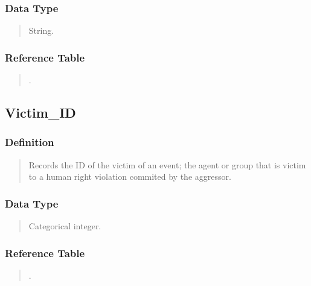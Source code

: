 \documentclass[letterpaper,10pt,english]{sphinxmanual}
\begin{document}
\subsubsection{Data Type}
\label{\detokenize{schema_tables:id6}}\begin{quote}

\sphinxAtStartPar
String.
\end{quote}


\subsubsection{Reference Table}
\label{\detokenize{schema_tables:id7}}\begin{quote}

\sphinxAtStartPar
{\hyperref[\detokenize{schema_tables:aggressor-table}]{}}.
\end{quote}


\subsection{Victim\_ID}
\label{\detokenize{schema_tables:victim-id}}

\subsubsection{Definition}
\label{\detokenize{schema_tables:id8}}\begin{quote}

\sphinxAtStartPar
Records the ID of the victim of an event; the agent or group that is victim to a human right violation commited by the aggressor.
\end{quote}


\subsubsection{Data Type}
\label{\detokenize{schema_tables:id9}}\begin{quote}

\sphinxAtStartPar
Categorical integer.
\end{quote}


\subsubsection{Reference Table}
\label{\detokenize{schema_tables:id10}}\begin{quote}

\sphinxAtStartPar
{\hyperref[\detokenize{schema_tables:victim-table}]{}}.
\end{quote}
\end{document}
